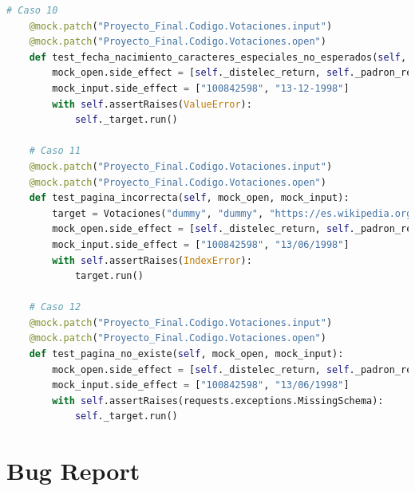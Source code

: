 \documentclass[conference]{IEEEtran}
\begin{document}
\begin{lstlisting}[language=Python, basicstyle=\tiny, breaklines=true,
    postbreak=\mbox{\textcolor{red}{$\hookrightarrow$}\space}]
    # Caso 10
    @mock.patch("Proyecto_Final.Codigo.Votaciones.input")
    @mock.patch("Proyecto_Final.Codigo.Votaciones.open")
    def test_fecha_nacimiento_caracteres_especiales_no_esperados(self, mock_open, mock_input):
        mock_open.side_effect = [self._distelec_return, self._padron_return]
        mock_input.side_effect = ["100842598", "13-12-1998"]
        with self.assertRaises(ValueError):
            self._target.run()

    # Caso 11
    @mock.patch("Proyecto_Final.Codigo.Votaciones.input")
    @mock.patch("Proyecto_Final.Codigo.Votaciones.open")
    def test_pagina_incorrecta(self, mock_open, mock_input):
        target = Votaciones("dummy", "dummy", "https://es.wikipedia.org/wiki/Elecciones_generales_de_Costa_Rica_de_3022")
        mock_open.side_effect = [self._distelec_return, self._padron_return]
        mock_input.side_effect = ["100842598", "13/06/1998"]
        with self.assertRaises(IndexError):
            target.run()

    # Caso 12
    @mock.patch("Proyecto_Final.Codigo.Votaciones.input")
    @mock.patch("Proyecto_Final.Codigo.Votaciones.open")
    def test_pagina_no_existe(self, mock_open, mock_input):
        mock_open.side_effect = [self._distelec_return, self._padron_return]
        mock_input.side_effect = ["100842598", "13/06/1998"]
        with self.assertRaises(requests.exceptions.MissingSchema):
            self._target.run()

\end{lstlisting}

\section{Bug Report}
\end{document}
